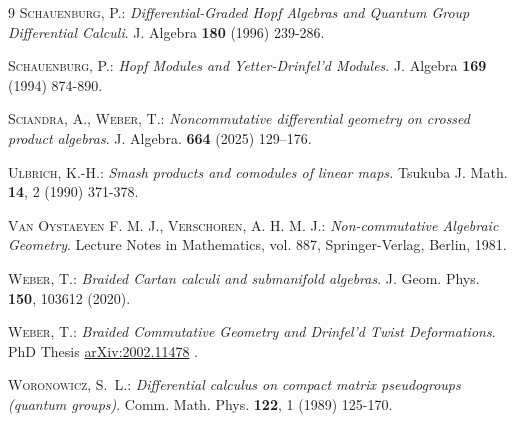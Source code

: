 \documentclass{article}
\theoremstyle{definition}
\begin{document}
{\begin{thebibliography}{9}
	\textsc{Schauenburg, P.:} 
	\emph{Differential-Graded Hopf Algebras and Quantum Group Differential Calculi}. 
	J. Algebra \textbf{180} (1996) 239-286.
	
	\textsc{Schauenburg, P.:} 
	\emph{Hopf Modules and Yetter-Drinfel'd Modules}.
	J. Algebra \textbf{169} (1994) 874-890.
	
	\textsc{Sciandra, A., Weber, T.:}
	\emph{Noncommutative differential geometry on crossed product algebras}.
	J. Algebra. \textbf{664} (2025) 129–176.
	
	\textsc{Ulbrich, K.-H.:} 
	\emph{Smash products and comodules of linear maps.} 
	Tsukuba J. Math. \textbf{14}, 2 (1990) 371-378.
	
	 \textsc{Van Oystaeyen F. M. J., Verschoren, A. H. M. J.:}
	\textit{Non-commutative
		Algebraic Geometry}. Lecture Notes in Mathematics, vol. 887, Springer-Verlag,
	Berlin, 1981.
	
	\textsc{Weber, T.:}
	\textit{Braided Cartan calculi and submanifold algebras}.
	J. Geom. Phys. \textbf{150}, 103612 (2020).
	
	\textsc{Weber, T.:}
	\textit{Braided Commutative Geometry and Drinfel’d Twist Deformations}.
	PhD Thesis \hyperlink{https://arxiv.org/abs/2002.11478}{arXiv:2002.11478} .
	
	\textsc{{Woronowicz}, S.~L.:}
	\textit{Differential calculus on compact matrix pseudogroups (quantum groups)}.
	Comm. Math. Phys. \textbf{122}, 1 (1989) 125-170.
\end{thebibliography}
}
\end{document}
